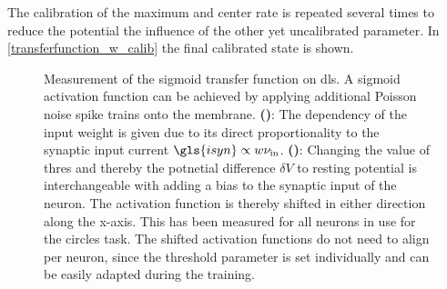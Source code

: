 The calibration of the maximum and center rate is repeated several times to reduce the potential the influence of the other yet uncalibrated parameter. In \cref{transferfunction_w_calib} the final calibrated state is shown. 



\begin{figure}
	\begin{subfigure}[c]{0.5\textwidth}
		\centering
		\caption{}
		
		\label{dlsactivationfunctionweight}
	\end{subfigure}	
	\begin{subfigure}[c]{0.5\textwidth}
		\centering
		\caption{}
		
		\label{dlsactivationfunctionbias}
	\end{subfigure}
	\caption[Measurement of the sigmoid transfer function on \gls{dls}]{Measurement of the sigmoid transfer function on \gls{dls}. A sigmoid activation function can be achieved by applying additional Poisson noise spike trains onto the membrane. \textbf{()}: The dependency of the input weight is given due to its direct proportionality to the synaptic input current $\gls{isyn} \propto w \nu_\text{in}$. \textbf{()}: Changing the value of \gls{thres} and thereby the potnetial difference $\delta V$ to resting potential is interchangeable with adding a bias to the synaptic input of the neuron. The activation function is thereby shifted in either direction along the x-axis. This has been measured for all neurons in use for the circles task. The shifted activation functions do not need to align per neuron, since the threshold parameter is set individually and can be easily adapted during the training.}
\end{figure}
%
%		


